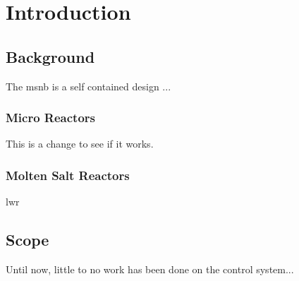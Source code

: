 \chapter{Introduction}
\label{Chapter:Introduction}

\section{Background}
The \acf{msnb} is a self contained design \cite{CarterPHD,PetersonMS}... 

\subsection{Micro Reactors}
This is a change to see if it works.

\subsection{Molten Salt Reactors}
\acf{lwr}


\section{Scope}
Until now, little to no work has been done on the control system... 